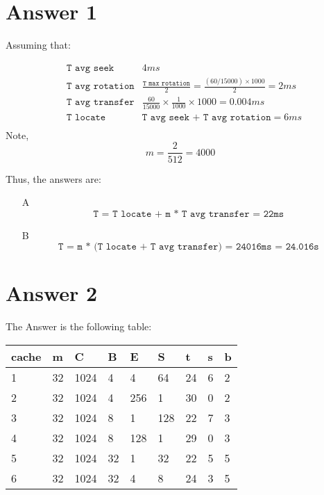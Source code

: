 \documentclass[12pt]{book}
\title{\coursetitle\linebreak\lecturename}
\author{\\Cain Susko\\ 
           \\ \\ \\
      Queen's University 
    \\School of Computing\\}
\begin{document}
\begin{titlepage}
        \maketitle
\end{titlepage}


\section*{Answer 1}
Assuming that:

\begin{align*}
        &\texttt{T avg seek} &4ms \\
        &\texttt{T avg rotation} &\frac{\texttt{T max rotation}}{2} =\frac{(60/15000) \times 1000}{2}  = 2ms \\
        &\texttt{T avg transfer} &\frac{60}{15000}\times\frac{1}{1000}\times1000 = 0.004ms \\
        &\texttt{T locate} &\texttt{T avg seek + T avg rotation} = 6ms\\
\end{align*}
Note, 
\[m = \frac{2}{512} = 4000\]

Thus, the answers are:
\begin{itemize}
        \item[A]
                \[\texttt{T = T locate + m * T avg transfer = 22ms}\]
        \item[B]
                \[\texttt{T = m * (T locate + T avg transfer) = 24016ms = 24.016s}\]
\end{itemize}

\section*{Answer 2}
The Answer is the following table:
\begin{table}[h]
\centering
\begin{tabular}{lllllllll}
\hline
cache & m  & C    & B  & E   & S   & t  & s & b \\ \hline
1     & 32 & 1024 & 4  & 4   & 64  & 24 & 6 & 2 \\
2     & 32 & 1024 & 4  & 256 & 1   & 30 & 0 & 2 \\
3     & 32 & 1024 & 8  & 1   & 128 & 22 & 7 & 3 \\
4     & 32 & 1024 & 8  & 128 & 1   & 29 & 0 & 3 \\
5     & 32 & 1024 & 32 & 1   & 32  & 22 & 5 & 5 \\
6     & 32 & 1024 & 32 & 4   & 8   & 24 & 3 & 5 \\ \hline
\end{tabular}
\end{table}
\pagebreak
\end{document}
